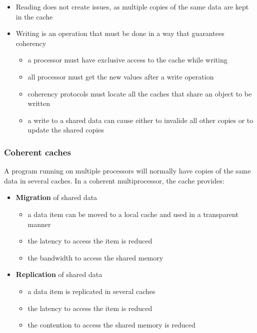 \documentclass[english]{article}
\begin{document}
\begin{itemize}
  \item Reading does not create issues, as multiple copies of the same data are kept in the cache
  \item Writing is an operation that must be done in a way that guarantees coherency
        \begin{itemize}
          \item a processor must have exclusive access to the cache while writing
          \item all processor must get the new values after a write operation
          \item coherency protocols must locate all the caches that share an object to be written
          \item a write to a shared data can cause either to invalide all other copies or to update the shared copies
        \end{itemize}
\end{itemize}

\subsubsection{Coherent caches}

A program running on multiple processors will normally have copies of the same data in several caches.
In a coherent multiprocessor, the cache provides:

\begin{itemize}
  \item \textbf{Migration} of shared data
        \begin{itemize}
          \item a data item can be moved to a local cache and used in a transparent manner
          \item the latency to access the item is reduced
          \item the bandwidth to access the shared memory
        \end{itemize}
  \item \textbf{Replication} of shared data
        \begin{itemize}
          \item a data item is replicated in several caches
          \item the latency to access the item is reduced
          \item the contention to access the shared memory is reduced
        \end{itemize}
\end{itemize}
\end{document}
